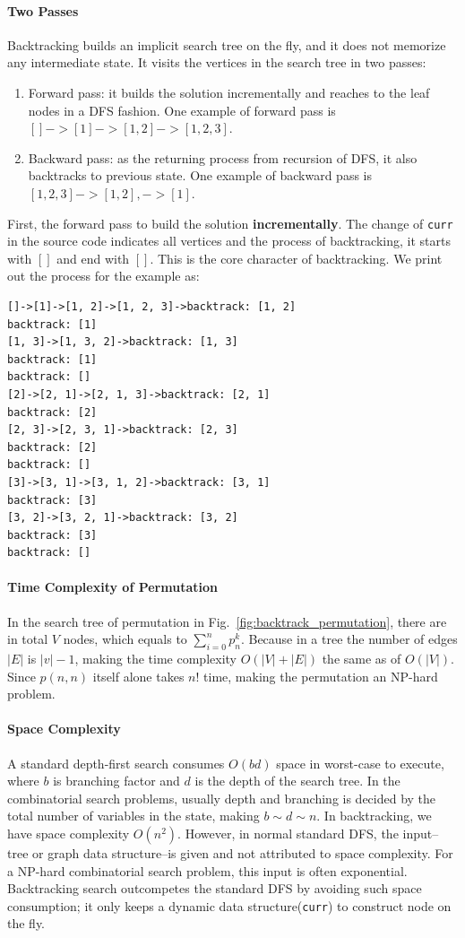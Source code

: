 \documentclass[../main.tex]{subfiles}
\begin{document}
\paragraph{Two Passes} Backtracking builds an implicit search tree on the fly, and it does not memorize any intermediate state. It visits the  vertices
 in the search tree in two passes: 
 \begin{enumerate}
     \item Forward pass: it builds the solution incrementally and reaches to the leaf nodes in a DFS fashion. One example of forward pass is $[]->[1]->[1,2]->[1,2,3]$.
     \item Backward pass: as the returning process from recursion of DFS, it also backtracks to previous state. One example of backward pass is $[1,2,3]->[1,2],->[1]$. 
 \end{enumerate}First, the forward pass to build the solution \textbf{incrementally}.
The change of \texttt{curr} in the source code indicates all vertices and the process of backtracking, it starts with $[]$ and end with $[]$. This is the core character of backtracking. We print out the process for the example as:
\begin{lstlisting}[numbers=none]
[]->[1]->[1, 2]->[1, 2, 3]->backtrack: [1, 2]
backtrack: [1]
[1, 3]->[1, 3, 2]->backtrack: [1, 3]
backtrack: [1]
backtrack: []
[2]->[2, 1]->[2, 1, 3]->backtrack: [2, 1]
backtrack: [2]
[2, 3]->[2, 3, 1]->backtrack: [2, 3]
backtrack: [2]
backtrack: []
[3]->[3, 1]->[3, 1, 2]->backtrack: [3, 1]
backtrack: [3]
[3, 2]->[3, 2, 1]->backtrack: [3, 2]
backtrack: [3]
backtrack: []
\end{lstlisting}

\paragraph{Time Complexity of Permutation}
In the search tree of permutation in Fig.~\ref{fig:backtrack_permutation}, there are in total $V$ nodes, which equals to $\sum_{i=0}^{n}{p_{n}^{k}}$. Because in a tree the number of edges $|E|$ is $|v|-1$, making the time complexity $O(|V|+|E|)$ the same as of $O(|V|)$. Since $p(n, n)$ itself alone takes $n!$ time, making the permutation an NP-hard problem. 

\paragraph{Space Complexity} A standard depth-first search consumes $O(bd)$ space in worst-case to execute, where $b$ is branching factor and $d$ is the depth of the search tree. In the combinatorial search problems, usually depth and branching is decided by the total number of variables in the state, making $b \sim d \sim n$. In backtracking, we have space complexity $O(n^2)$. However, in normal standard DFS, the input--tree or graph data structure--is given and not attributed to space complexity. For a NP-hard combinatorial search problem, this input is often exponential. Backtracking search outcompetes the standard DFS by avoiding such space consumption; it only keeps a dynamic data structure(\texttt{curr})  to construct node on the fly.  %
\end{document}
